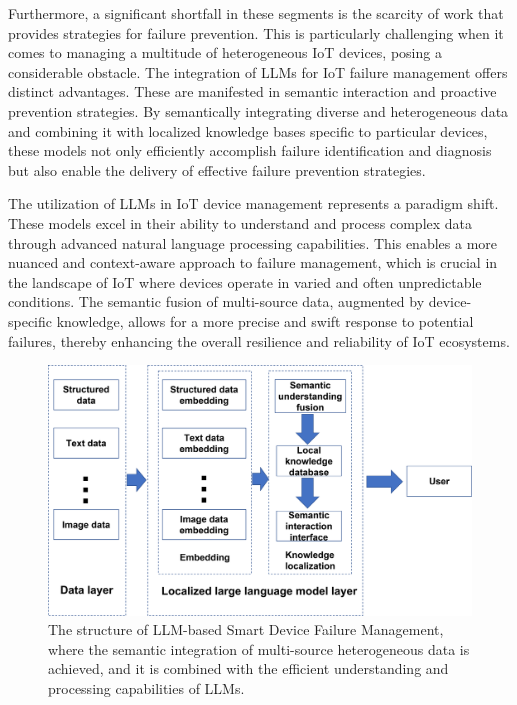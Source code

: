 \documentclass[preprint,12pt]{elsarticle}
\begin{document}
Furthermore, a significant shortfall in these segments is the scarcity of work that provides strategies for failure prevention. This is particularly challenging when it comes to managing a multitude of heterogeneous IoT devices, posing a considerable obstacle. The integration of LLMs for IoT failure management offers distinct advantages. These are manifested in semantic interaction and proactive prevention strategies. By semantically integrating diverse and heterogeneous data and combining it with localized knowledge bases specific to particular devices, these models not only efficiently accomplish failure identification and diagnosis but also enable the delivery of effective failure prevention strategies.

The utilization of LLMs in IoT device management represents a paradigm shift. These models excel in their ability to understand and process complex data through advanced natural language processing capabilities. This enables a more nuanced and context-aware approach to failure management, which is crucial in the landscape of IoT where devices operate in varied and often unpredictable conditions. The semantic fusion of multi-source data, augmented by device-specific knowledge, allows for a more precise and swift response to potential failures, thereby enhancing the overall resilience and reliability of IoT ecosystems.


\begin{figure}[h]
	\centering
	\includegraphics[width=\linewidth]{fig_model.png}
	\caption{The structure of LLM-based Smart Device Failure Management, where the semantic integration of multi-source heterogeneous data is achieved, and it is combined with the efficient understanding and processing capabilities of LLMs. }
	\label{fig_model}
\end{figure}
\end{document}
